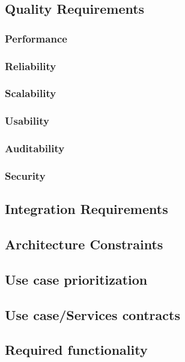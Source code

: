 \documentclass[a4paper,12pt]{article}
\begin{document}
\subsection{Quality Requirements}

\subsubsection{Performance}

\subsubsection{Reliability}

\subsubsection{Scalability}

\subsubsection{Usability} 

\subsubsection{Auditability}

\subsubsection{Security}

\subsection{Integration Requirements}

\subsection{Architecture Constraints}

\subsection{Use case prioritization}

\subsection{Use case/Services contracts}

\subsection{Required functionality}
\end{document}
